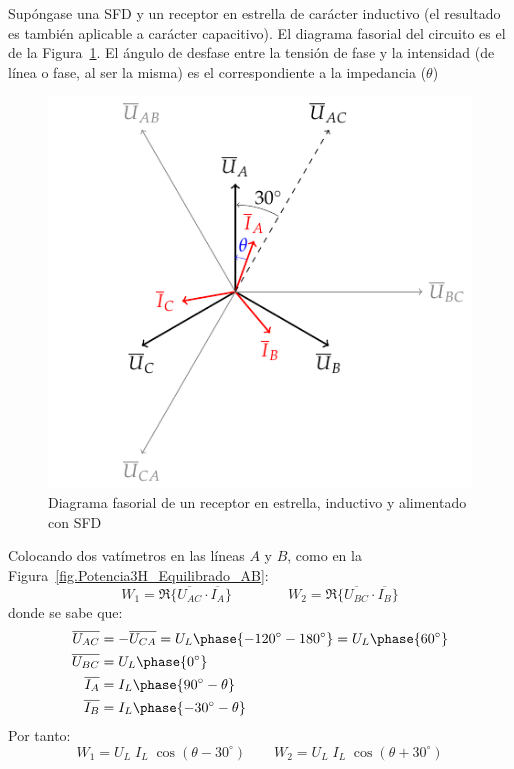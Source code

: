 	Supóngase una SFD y un receptor en estrella de carácter inductivo (el resultado es también aplicable a carácter capacitivo). El diagrama fasorial del circuito es el de la Figura~\ref{fig.fasores_potencia3H}. El ángulo de desfase entre la tensión de fase y la intensidad (de línea o fase, al ser la misma) es el correspondiente a la impedancia ($\theta$)
	\begin{figure}[H]
	    \centering
	    \includegraphics{../figs/fasores_potencia3H.pdf}
	    \caption{Diagrama fasorial de un receptor en estrella, inductivo y alimentado con SFD}
	    \label{fig.fasores_potencia3H}
	\end{figure}
	
	Colocando dos vatímetros en las líneas $A$ y $B$, como en la Figura~\ref{fig.Potencia3H_Equilibrado_AB}:
	\begin{equation*}
	    W_1=\Re\{\overline{U_{AC}} \cdot \overline{I_A}\}\qquad\qquad W_2=\Re\{\overline{U_{BC}} \cdot \overline{I_B}\}
	\end{equation*}
	donde se sabe que:
	\begin{align*} \overline{U_{AC}}&=-\overline{U_{CA}}=U_L\phase{-120^\circ-180^\circ}=U_L\phase{60^\circ}\\ \overline{U_{BC}}&=U_L\phase{0^\circ}\\ \overline{I_A}&=I_L\phase{90^\circ-\theta}\\ \overline{I_B}&=I_L\phase{-30^\circ-\theta} 
	\end{align*}
	Por tanto: 
	\begin{equation*}
	    W_1=U_L\;I_L\;\cos{(\theta-30^\circ)}\qquad W_2={U_L}\; {I_L}\;\cos{(\theta+30^\circ)}
	\end{equation*}
	
